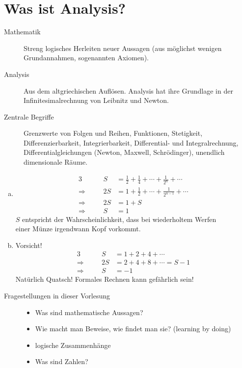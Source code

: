 \documentclass[../ana1.tex]{subfiles}
\begin{document}
\section{Was ist Analysis?}
\begin{description}
	\item[Mathematik]
		Streng logisches Herleiten neuer Aussagen (aus möglichst wenigen Grundannahmen, sogenannten Axiomen).
	\item[Analysis]
		Aus dem altgriechischen \glqq Auflösen\grqq. Analysis hat ihre Grundlage in der \glqq Infinitesimalrechnung\grqq\: von Leibnitz und Newton.
	\item[Zentrale Begriffe]
		Grenzwerte von Folgen und Reihen, Funktionen, Stetigkeit, Differenzierbarkeit, Integrierbarkeit, Differential- und Integralrechnung, Differentialgleichungen (Newton, Maxwell, Schrödinger), unendlich dimensionale Räume.
\end{description}
\begin{bsp}\leavevmode
	\begin{enumerate}[(a)]
		\item
			\begin{alignat*}{3}
							   &&             S &= \frac{1}{2} + \frac{1}{4} + \cdots + \frac{1}{2^{n}} + \cdots \\
				\Longrightarrow&\quad& 		 2S &= 1 + \frac{1}{2} + \cdots + \frac{1}{2^{n-1}} + \cdots \\
				\Longrightarrow&\quad& 	     2S &= 1 + S \\
				\Longrightarrow&&             S &= 1
			\end{alignat*}
			\(S\) entspricht der Wahrscheinlichkeit, dass bei wiederholtem Werfen \\
			einer Münze irgendwann Kopf vorkommt.\\
		\item Vorsicht!
			\begin{alignat*}{3}
							   &&       S &= 1 + 2 + 4 + \cdots\\
				\Longrightarrow&\quad& 2S &= 2 + 4 + 8 + \cdots = S - 1\\
				\Longrightarrow&\quad&  S &= -1
			\end{alignat*}
			Natürlich Quatsch! Formales Rechnen kann gefährlich sein!
	\end{enumerate}
\end{bsp}
\begin{description}
	\item[Fragestellungen in dieser Vorlesung]\leavevmode
		\begin{itemize}
			\item Was sind mathematische Aussagen?
			\item Wie macht man Beweise, wie findet man sie? (learning by doing)
			\item logische Zusammenhänge
			\item Was sind Zahlen?
		\end{itemize} 
\end{description}
\end{document}
